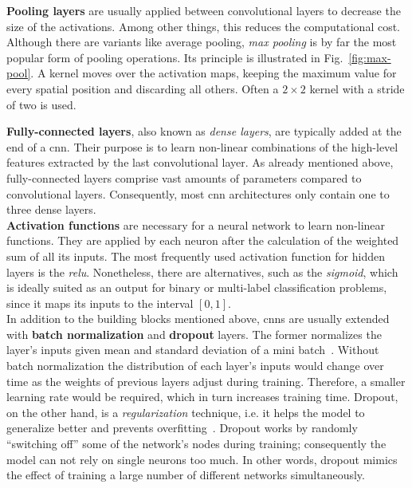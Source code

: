 \textbf{Pooling layers} are usually applied between convolutional layers to decrease the size of the activations. Among other things, this reduces the computational cost. Although there are variants like average pooling, \textit{max pooling} is by far the most popular form of pooling operations. Its principle is illustrated in Fig.~\ref{fig:max-pool}. A kernel moves over the activation maps, keeping the maximum value for every spatial position and discarding all others. Often a $2 \times 2$ kernel with a stride of two is used.\\

\textbf{Fully-connected layers}, also known as \textit{dense layers}, are typically added at the end of a \gls{cnn}. Their purpose is to learn non-linear combinations of the high-level features extracted by the last convolutional layer. As already mentioned above, fully-connected layers comprise vast amounts of parameters compared to convolutional layers. Consequently, most \gls{cnn} architectures only contain one to three dense layers.\\

\textbf{Activation functions} are necessary for a neural network to learn non-linear functions. They are applied by each neuron after the calculation of the weighted sum of all its inputs. The most frequently used activation function for hidden layers is the \textit{\gls{relu}}. Nonetheless, there are alternatives, such as the \textit{sigmoid}, which is ideally suited as an output for binary or multi-label classification problems, since it maps its inputs to the interval $[0, 1]$.\\

In addition to the building blocks mentioned above, \glspl{cnn} are usually extended with \textbf{batch normalization} and \textbf{dropout} layers. The former normalizes the layer's inputs given mean and standard deviation of a mini batch~\cite{ioffe2015batchnorm}. Without batch normalization the distribution of each layer's inputs would change over time as the weights of previous layers adjust during training. Therefore, a smaller learning rate would be required, which in turn increases training time. Dropout, on the other hand, is a \textit{regularization} technique, i.e. it helps the model to generalize better and prevents overfitting~\cite{srivastava2014dropout}. Dropout works by randomly \enquote{switching off} some of the network's nodes during training; consequently the model can not rely on single neurons too much. In other words, dropout mimics the effect of training a large number of different networks simultaneously.

